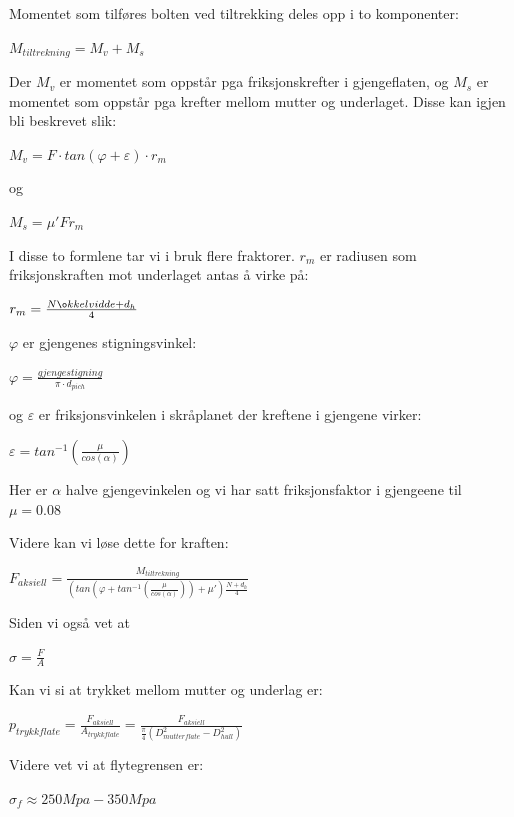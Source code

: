 Momentet som tilføres bolten ved tiltrekking deles opp i to komponenter:
\begin{center}
$M_{tiltrekning}=M_{v}+M_{s}$
\end{center}
Der $M_{v}$ er momentet som oppstår pga friksjonskrefter i gjengeflaten, og $M_{s}$ er momentet som oppstår pga krefter mellom mutter og underlaget. Disse kan igjen bli beskrevet slik:
\begin{center}
$M_{v}=F\cdot tan(\varphi +\varepsilon )\cdot r_{m}$
\end{center}
og
\begin{center}
$M_{s}=\mu 'Fr_{m}$
\end{center}
I disse to formlene tar vi i bruk flere fraktorer. $ r_{m}$ er radiusen som friksjonskraften mot underlaget antas å virke på:
\begin{center}
$r_{m}=\frac{N\o kkelvidde+d_{h}}{4}$
\end{center}
$\varphi$ er gjengenes stigningsvinkel:
\begin{center}
$\varphi =\frac{gjengestigning}{\pi \cdot d_{pich}}$
\end{center}
og $\varepsilon$ er friksjonsvinkelen i skråplanet der kreftene i gjengene virker:
\begin{center}
$\varepsilon =tan^{-1}(\frac{\mu}{cos(\alpha )})$
\end{center}
Her er $\alpha$ halve gjengevinkelen og vi har satt friksjonsfaktor i gjengeene til $\mu=0.08$ \cite{FriksjonsfaktorGjenger} %

Videre kan vi løse dette for kraften:
\begin{center}
$F_{aksiell}=\frac{M_{tiltrekning}}{(tan(\varphi +tan^{-1}(\frac{\mu }{cos(\alpha )}))+\mu')\frac{N+d_{h}}{4}}$
\end{center}
Siden vi også vet at
\begin{center}
$\sigma=\frac{F}{A}$
\end{center}
Kan vi si at trykket mellom mutter og underlag er:
\begin{center}
$p_{trykkflate}=\frac{F_{aksiell}}{A_{trykkflate}}=\frac{F_{aksiell}}{\frac{\pi }{4}(D_{mutterflate}^{2}-D_{hull}^{2})}$
\end{center}
Videre vet vi at flytegrensen er:

\begin{center}
$\sigma _{f}\approx 250 Mpa-350 Mpa$
\end{center}

